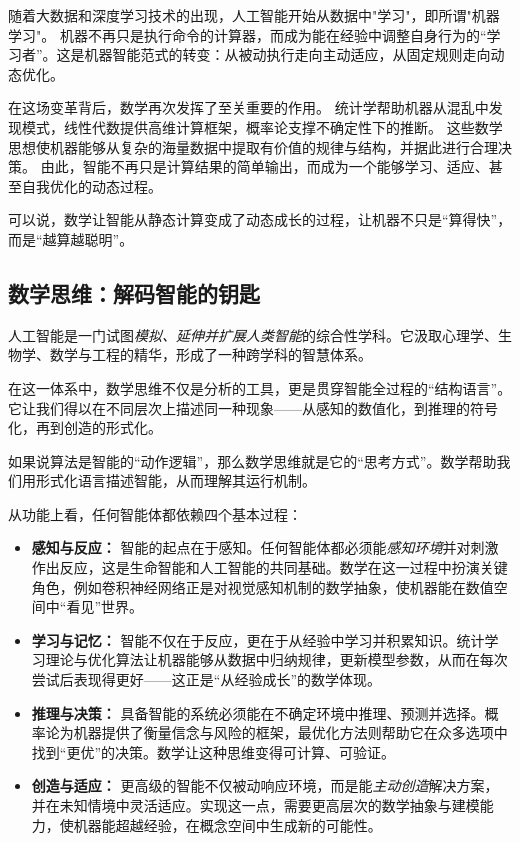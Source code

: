 随着大数据和深度学习技术的出现，人工智能开始从数据中"学习"，即所谓"机器学习"。
机器不再只是执行命令的计算器，而成为能在经验中调整自身行为的“学习者”。这是机器智能范式的转变：从被动执行走向主动适应，从固定规则走向动态优化。

在这场变革背后，数学再次发挥了至关重要的作用。
统计学帮助机器从混乱中发现模式，线性代数提供高维计算框架，概率论支撑不确定性下的推断。
这些数学思想使机器能够从复杂的海量数据中提取有价值的规律与结构，并据此进行合理决策。
由此，智能不再只是计算结果的简单输出，而成为一个能够学习、适应、甚至自我优化的动态过程。

可以说，数学让智能从静态计算变成了动态成长的过程，让机器不只是“算得快”，而是“越算越聪明”。

\subsection{数学思维：解码智能的钥匙}
人工智能是一门试图\emph{模拟、延伸并扩展人类智能}的综合性学科。它汲取心理学、生物学、数学与工程的精华，形成了一种跨学科的智慧体系。

在这一体系中，数学思维不仅是分析的工具，更是贯穿智能全过程的“结构语言”。
它让我们得以在不同层次上描述同一种现象——从感知的数值化，到推理的符号化，再到创造的形式化。

如果说算法是智能的“动作逻辑”，那么数学思维就是它的“思考方式”。数学帮助我们用形式化语言描述智能，从而理解其运行机制。

从功能上看，任何智能体都依赖四个基本过程：

\begin{itemize}
\item \textbf{感知与反应：} 智能的起点在于感知。任何智能体都必须能\emph{感知环境}并对刺激作出反应，这是生命智能和人工智能的共同基础。数学在这一过程中扮演关键角色，例如卷积神经网络正是对视觉感知机制的数学抽象，使机器能在数值空间中“看见”世界。

\item \textbf{学习与记忆：} 智能不仅在于反应，更在于从经验中学习并积累知识。统计学习理论与优化算法让机器能够从数据中归纳规律，更新模型参数，从而在每次尝试后表现得更好——这正是“从经验成长”的数学体现。

\item \textbf{推理与决策：} 具备智能的系统必须能在不确定环境中推理、预测并选择。概率论为机器提供了衡量信念与风险的框架，最优化方法则帮助它在众多选项中找到“更优”的决策。数学让这种思维变得可计算、可验证。

\item \textbf{创造与适应：} 更高级的智能不仅被动响应环境，而是能\emph{主动创造}解决方案，并在未知情境中灵活适应。实现这一点，需要更高层次的数学抽象与建模能力，使机器能超越经验，在概念空间中生成新的可能性。
\end{itemize}

